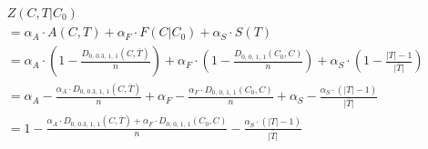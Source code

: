 \documentclass{standalone}
\begin{document}
$\begin{aligned}
 & Z(C, T\vert C_{0})\\  
 & = \alpha_{A}\cdot A(C, T) + \alpha_{F}\cdot F(C\vert C_{0}) + \alpha_{S}\cdot S(T)\\
 & = \alpha_{A}\cdot (1-\frac{D_{0,\, 0.3,\, 1,\, 1}(C, \overline{T})}{n}) + \alpha_{F}\cdot (1-\frac{D_{0,\, 0,\, 1,\, 1}(C_{0}, C)}{n}) + \alpha_{S}\cdot (1-\frac{\vert T\vert-1}{\vert\overline{T}\vert})\\
 & =  \alpha_{A} - \frac{\alpha_{A}\cdot D_{0,\, 0.3,\, 1,\, 1}(C, \overline{T})}{n} + \alpha_{F} - \frac{\alpha_{F}\cdot D_{0,\, 0,\, 1,\, 1}(C_{0}, C)}{n} + \alpha_{S} - \frac{\alpha_{S}\cdot(\vert T\vert-1)}{\vert\overline{T}\vert}\\
 & = 1 - \frac{\alpha_{A}\cdot D_{0,\, 0.3,\, 1,\, 1}(C, \overline{T})+ \alpha_{F}\cdot D_{0,\, 0,\, 1,\, 1}(C_{0}, C)}{n} - \frac{\alpha_{S}\cdot(\vert T\vert-1)}{\vert\overline{T}\vert}
\end{aligned}$
\end{document}
